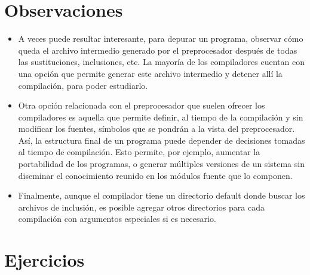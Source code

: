 \section{Observaciones}

\begin{itemize}
	\item A veces puede resultar interesante, para depurar un programa, observar cómo queda el archivo
intermedio generado por el preprocesador después de todas las sustituciones, inclusiones, etc. La
mayoría de los compiladores cuentan con una opción que permite generar este archivo intermedio y
detener allí la compilación, para poder estudiarlo.
	\item Otra opción relacionada con el preprocesador que suelen ofrecer los compiladores es aquella que
permite definir, al tiempo de la compilación y sin modificar los fuentes, símbolos que se pondrán a la
vista del preprocesador. Así, la estructura final de un programa puede depender de decisiones tomadas
al tiempo de compilación. Esto permite, por ejemplo, aumentar la portabilidad de los programas, o
generar múltiples versiones de un sistema sin diseminar el conocimiento reunido en los módulos
fuente que lo componen.
	\item Finalmente, aunque el compilador tiene un directorio default donde buscar los archivos de inclusión,
es posible agregar otros directorios para cada compilación con argumentos especiales si es necesario.
\end{itemize}



\section{Ejercicios}

